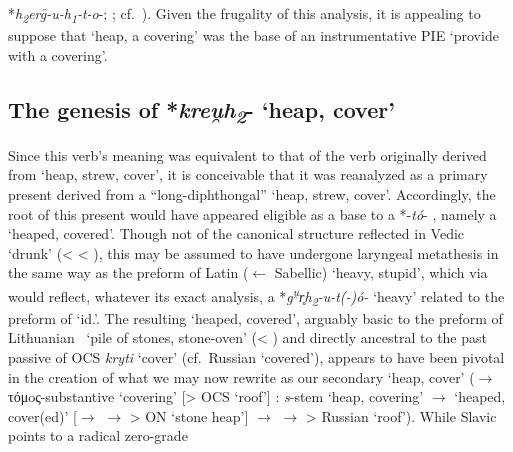 \documentclass[output=paper,colorlinks,citecolor=brown]{langscibook}
\begin{document}
*\textit{h\textsubscript{2}erg̑-u-h\textsubscript{1}-t-o}-; \citealt{Nussbaum1996}; cf.\ ). Given the frugality of this analysis, it is appealing to suppose that  ‘heap, a covering’ was the base of an instrumentative PIE    ‘provide with a covering’.

\subsection{The genesis of *\textit{kreu̯h\textsubscript{2}}- ‘heap, cover’}


Since this verb’s meaning was equivalent to that of the verb originally derived from  ‘heap, strew, cover’, it is conceivable that it was reanalyzed as a primary present  derived from a “long-diphthongal”  ‘heap, strew, cover’. Accordingly, the root of this present would have appeared eligible as a base to a *-\textit{tó}-  , namely a  ‘heaped, covered’. Though not of the canonical structure reflected in Vedic  ‘drunk’ (<  < \mbox{),} this  may be assumed to have undergone laryngeal metathesis in the same way as the preform of Latin ($\leftarrow$ Sabellic)  ‘heavy, stupid’, which via  would reflect, whatever its exact analysis, a *\textit{\mbox{g\textsuperscript{u̯}r̥h\textsubscript{2}-u-t(-)}ó-} ‘heavy’ related to the preform of  ‘id.’. The resulting  ‘heaped, covered’, arguably basic to the preform of Lithuanian \ ‘pile of stones, stone-oven’ (< ) and directly ancestral to the past passive  of OCS \textit{kryti} ‘cover’ (cf.\ Russian  ‘covered’), appears to have been pivotal in the creation of what we may now rewrite as our secondary  ‘heap, cover’ ($\rightarrow$ τόμoς-substantive  ‘covering’ [> OCS  ‘roof’] : \textit{s}-stem  ‘heap, covering’ $\rightarrow$  ‘heaped, cover(ed)’ [$\rightarrow$  $\rightarrow$  > ON  ‘stone heap’] $\rightarrow$  $\rightarrow$  > Russian  ‘roof’). While Slavic points to a radical zero-grade 
\end{document}
